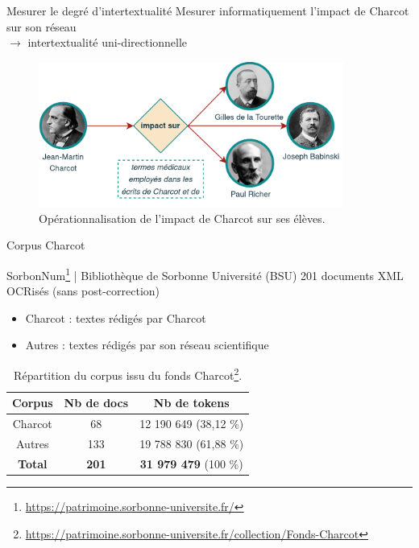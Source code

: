 \begin{frame}{Mesurer le degré d'intertextualité}
Mesurer informatiquement l'impact de Charcot sur son \og{}réseau\fg{} \\$\rightarrow$ intertextualité uni-directionnelle\\
\begin{figure}[!h]
    \centering
\includegraphics[width=100mm,scale=0.5]{pic/charcot_intertextualite.png}
    \caption{Opérationnalisation de l'impact de Charcot sur ses élèves.}
    \label{fig:my_label}
\end{figure}
\end{frame}

\begin{frame}{Corpus Charcot}
\begin{block}{SorbonNum\footnote{\tiny{\url{https://patrimoine.sorbonne-universite.fr/}}} | Bibliothèque de Sorbonne Université (BSU)}
201 documents XML OCRisés (sans post-correction)
\end{block}
\begin{itemize}
    \item \textrm{Charcot} : textes rédigés par Charcot
    \item \textrm{Autres} : textes rédigés par son réseau scientifique
\end{itemize}
\begin{table}[!ht]
    \centering
    \begin{tabular}{|c|c|c|}
    \hline 
    \rowcolor{gray!30}
       Corpus & Nb de docs & Nb de tokens \\
       \hline
       \textrm{Charcot}  & 68 & 12 190 649 (38,12 \%) \\
       \textrm{Autres}  & 133 & 19 788 830 (61,88 \%) \\
       \hline\hline
       \textbf{Total} & \textbf{201} & \textbf{31 979 479} (100 \%)\\
       \hline
    \end{tabular}
    \caption{Répartition du corpus issu du fonds Charcot\footnote{\tiny{\url{https://patrimoine.sorbonne-universite.fr/collection/Fonds-Charcot}}}.}
    \label{tab:my_label}
\end{table}
\end{frame}

